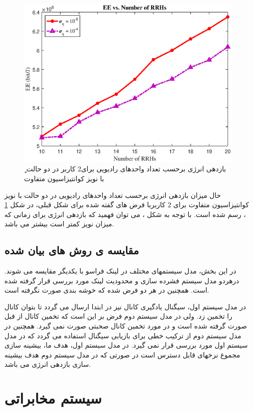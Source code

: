 \begin{figure}[H]
  \centering
    \includegraphics[width=\linewidth]{./fig/sigmaul}
  \caption{ٍ بازدهی انرژی برحسب تعداد واحدهای رادیویی برای2 کاربر  در دو حالت با نویز کوانتیزاسیون متفاوت }
  \label{fig:sigmaul}
  \end{figure}
      حال میزان بازدهی انرژی برحسب تعداد واحدهای رادیویی  در دو حالت با نویز کوانتیزاسیون متفاوت برای 2 کاربربا فرض های گفته شده برای شکل قبلی،  در شکل \ref{fig:sigmaul} ، رسم شده است.
  با توجه به شکل ، می توان فهمید که بازدهی انرژی برای زمانی که میزان نویز کمتر است بیشتر می باشد.
\subsection{مقایسه ی روش های بیان شده}
در این بخش، مدل سیستمهای مختلف در لینک فراسو با یکدیگر مقایسه می شوند.
درهردو مدل سیستم فشرده سازی و محدودیت لینک  مورد بررسی قرار گرفته شده است. همچنین در هر دو فرض شده که خوشه بندی صورت نگرفته است. 

در مدل سیستم اول، سیگنال یادگیری کانال نیز در ابتدا ارسال می گردد تا بتوان کانال را تخمین زد. ولی در مدل سیستم دوم فرض بر این است که تخمین کانال از قبل صورت گرفته شده است و در مورد تخمین کانال صحبتی صورت نمی گیرد. همچنین در مدل سیستم دوم از ترکیب خطی 
برای بازیابی سیگنال استفاده می گردد که در مدل سیستم اول مورد بررسی قرار نمی گیرد.
در مدل سیستم اول، هدف ما، بیشینه سازی مجموع نرخهای قابل دسترس است در صورتی که در مدل سیستم دوم هدف بیشینه سازی بازدهی انرژی می باشد.

\section{سیستم مخابراتی  }

